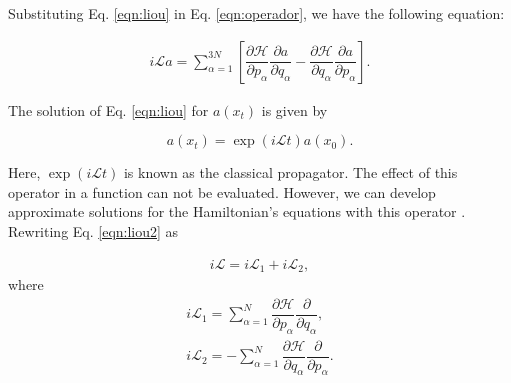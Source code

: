 \documentclass[
	12pt,				%
	openany,			%
	oneside,			%
	a4paper,			%
	english,			%
	brazil				%
	]{abntex2}
\providecommand{\DIFaddbegin}{}
\providecommand{\DIFaddend}{}
\providecommand{\DIFdelbegin}{}
\providecommand{\DIFdelend}{}
\providecommand{\DIFaddbegin}{} %
\providecommand{\DIFaddend}{} %
\providecommand{\DIFdelbegin}{} %
\providecommand{\DIFdelend}{} %
\begin{document}
Substituting Eq. \ref{eqn:liou} in Eq. \ref{eqn:operador}, we have the following equation:

\begin{equation}
\begin{aligned}
i\mathcal{L} a = \sum_{\alpha=1}^{3N} \left [  \dfrac{\partial \mathcal{H}}{\partial p_{\alpha}}\dfrac{\partial a}{\partial q_{\alpha}}  -  \dfrac{\partial \mathcal{H}}{\partial q_{\alpha}} \dfrac{\partial a}{\partial p_{\alpha}} \right].
\label{eqn:liou2}
\end{aligned}
\end{equation}

The solution of Eq. \ref{eqn:liou} for $a(x_{t})$ is given by

\begin{equation}
a(x_{t}) = \exp (i\mathcal{L}t) a(x_{0}).
\label{eqn:exactsol}
\end{equation}

Here, $\exp (i\mathcal{L}t)$ is known as the classical propagator. The effect of this operator in a function can not be evaluated. However, we can develop approximate solutions for the Hamiltonian's equations with this operator \cite{tuckerman}. Rewriting Eq. \ref{eqn:liou2} as

\begin{equation}
\begin{aligned}
i\mathcal{L}  =  i\mathcal{L}_{1} + i\mathcal{L}_{2},
\end{aligned}
\end{equation}
where
\begin{equation}
\DIFdelbegin %
\DIFdelend \DIFaddbegin \begin{aligned}
i\mathcal{L}_{1} = \sum_{\alpha=1}^{N}  \dfrac{\partial \mathcal{H}}{\partial p_{\alpha}}\dfrac{\partial }{\partial q_{\alpha}} ,   \\
i\mathcal{L}_{2} = - \sum_{\alpha=1}^{N}  \dfrac{\partial \mathcal{H}}{\partial q_{\alpha}} \dfrac{\partial }{\partial p_{\alpha}}.
\end{aligned}
\DIFaddend \end{equation}
\end{document}
